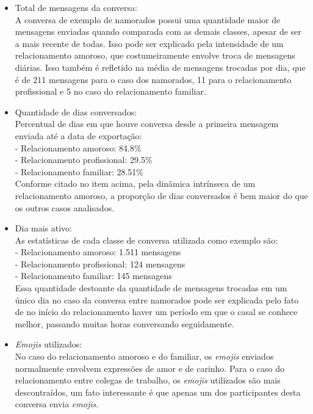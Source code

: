 \begin{itemize}
    \item Total de mensagens da conversa:\\
    A conversa de exemplo de namorados possui uma quantidade maior de mensagens enviadas quando comparada com as demais classes, apesar de ser a mais recente de todas. Isso pode ser explicado pela intensidade de um relacionamento amoroso, que costumeiramente envolve troca de mensagens diárias. Isso também é refletido na média de mensagens trocadas por dia, que é de 211 mensagens para o caso dos namorados, 11 para o relacionamento profissional e 5 no caso do relacionamento familiar.
    
    \item Quantidade de dias conversados:\\
    Percentual de dias em que houve conversa desde a primeira mensagem enviada até a data de exportação:\\
    \hspace{1cm}- Relacionamento amoroso: 84.8\%\\
    \hspace{1cm}- Relacionamento profissional: 29.5\%\\
    \hspace{1cm}- Relacionamento familiar: 28.51\%\\
    Conforme citado no item acima, pela dinâmica intrínseca de um relacionamento amoroso, a proporção de dias conversados é bem maior do que os outros casos analisados.
    
    \item Dia mais ativo:\\
    As estatísticas de cada classe de conversa utilizada como exemplo são:\\
    \hspace{1cm}- Relacionamento amoroso: 1.511 mensagens\\
    \hspace{1cm}- Relacionamento profissional: 124 mensagens\\
    \hspace{1cm}- Relacionamento familiar: 145 mensagens\\
    Essa quantidade destoante da quantidade de mensagens trocadas em um único dia no caso da conversa entre namorados pode ser explicada pelo fato de no início do relacionamento haver um período em que o casal se conhece melhor, passando muitas horas conversando seguidamente.
    
    \item \textit{Emojis} utilizados:\\
    No caso do relacionamento amoroso e do familiar, os \textit{emojis} enviados normalmente envolvem expressões de amor e de carinho. Para o caso do relacionamento entre colegas de trabalho, os \textit{emojis} utilizados são mais descontraídos, um fato interessante é que apenas um dos participantes desta conversa envia \textit{emojis}.


\end{itemize}
